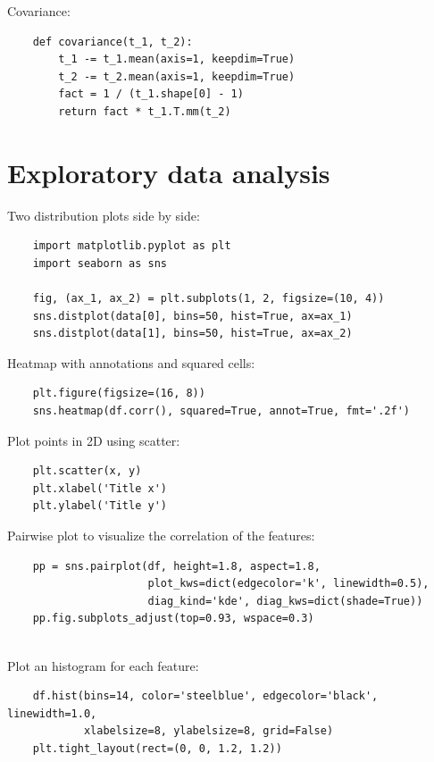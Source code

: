 \documentclass[12pt]{report}
\begin{document}
        Covariance:
        \begin{verbatim}
    def covariance(t_1, t_2):
        t_1 -= t_1.mean(axis=1, keepdim=True)
        t_2 -= t_2.mean(axis=1, keepdim=True)
        fact = 1 / (t_1.shape[0] - 1)
        return fact * t_1.T.mm(t_2)
        \end{verbatim}
    \section{Exploratory data analysis}
        Two distribution plots side by side:
        \begin{verbatim}
    import matplotlib.pyplot as plt
    import seaborn as sns
    
    fig, (ax_1, ax_2) = plt.subplots(1, 2, figsize=(10, 4))
    sns.distplot(data[0], bins=50, hist=True, ax=ax_1)
    sns.distplot(data[1], bins=50, hist=True, ax=ax_2)
        \end{verbatim}
            
        Heatmap with annotations and squared cells:
        \begin{verbatim}
    plt.figure(figsize=(16, 8))
    sns.heatmap(df.corr(), squared=True, annot=True, fmt='.2f')
        \end{verbatim}
        
        Plot points in 2D using scatter:
        \begin{verbatim}
    plt.scatter(x, y)
    plt.xlabel('Title x')
    plt.ylabel('Title y')
        \end{verbatim}
        
        Pairwise plot to visualize the correlation of the features:
        \begin{verbatim}
    pp = sns.pairplot(df, height=1.8, aspect=1.8,
                      plot_kws=dict(edgecolor='k', linewidth=0.5),
                      diag_kind='kde', diag_kws=dict(shade=True))
    pp.fig.subplots_adjust(top=0.93, wspace=0.3)
    
        \end{verbatim}
        
        Plot an histogram for each feature:
        \begin{verbatim}
    df.hist(bins=14, color='steelblue', edgecolor='black', linewidth=1.0,
            xlabelsize=8, ylabelsize=8, grid=False)
    plt.tight_layout(rect=(0, 0, 1.2, 1.2))
        \end{verbatim}
        
\end{document}
